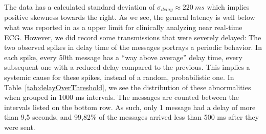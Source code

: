 The data has a calculated standard deviation of $\sigma_{delay} \approx {220}\:ms$ which implies positive skewness towards the right. As we see, the general latency is well below what was reported in \cite{Alesanco:2010kc} as a upper limit for clinically analyzing near real-time ECG. However, we did record some transmissions that were severely delayed: The two observed spikes in delay time of the messages portrays a periodic behavior. In each spike, every 50th message has a ``way above average'' delay time, every subsequent one with a reduced delay compared to the previous. This implies a systemic cause for these spikes, instead of a random, probabilistic one. In Table~\ref{tab:delayOverThreshold}, we see the distribution of these abnormalities when grouped in 1000 ms intervals. The messages are counted between the intervals listed on the bottom row. As such, only 1 message had a delay of more than 9,5 seconds, and 99,82\% of the messages arrived less than 500 ms after they were sent.



